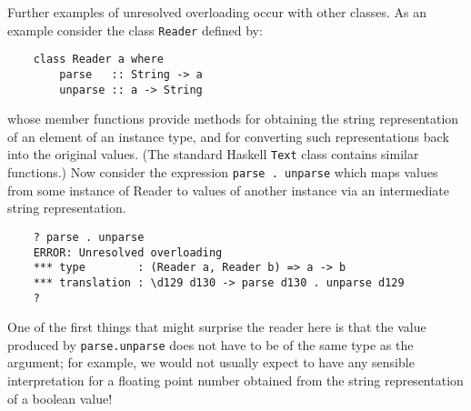 Further examples of unresolved overloading occur  with  other  classes.
As an example consider the class \verb"Reader" defined by:
\begin{verbatim}
    class Reader a where 
        parse   :: String -> a   
        unparse :: a -> String
\end{verbatim}
whose  member  functions  provide  methods  for  obtaining  the  string
representation of an element of an instance type,  and  for  converting
such representations  back  into  the  original  values.  (The  standard
Haskell \verb"Text" class  contains  similar  functions.)   Now  consider  the
expression \verb"parse . unparse" which maps values from  some  instance  of
Reader to  values  of  another  instance  via  an  intermediate  string
representation.
\begin{verbatim}
    ? parse . unparse
    ERROR: Unresolved overloading
    *** type        : (Reader a, Reader b) => a -> b
    *** translation : \d129 d130 -> parse d130 . unparse d129
    ?
\end{verbatim}
One of the first things that might surprise the reader here is that the
value produced by \verb"parse.unparse" does not have to  be  of  the  same
type as the argument; for example, we would not usually expect to  have
any sensible interpretation for a floating point number  obtained  from
the string representation of a boolean value!

